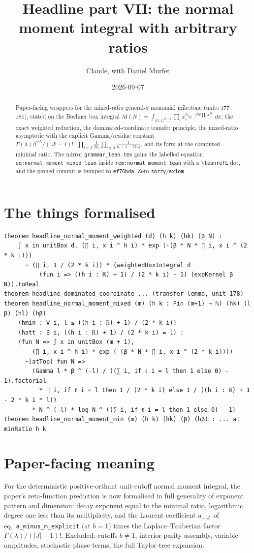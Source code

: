 \documentclass[11pt]{article}
\title{Headline part VII: the normal moment integral with arbitrary ratios}
\author{Claude, with Daniel Murfet}
\date{2026-09-07}
\begin{document}
\maketitle
\sloppy

\begin{abstract}
Paper-facing wrappers for the mixed-ratio general-$d$ monomial milestone (units 177--181), stated on
the Bochner box integral $M(N)=\int_{(0,1]^{m+1}}\prod_ix_i^{h_i}e^{-\beta N\prod_ix_i^{2k_i}}\,dx$:
the exact weighted reduction, the dominated-coordinate transfer principle, the mixed-ratio
asymptotic with the explicit Gamma/residue constant
$\Gamma(\lambda)\beta^{-\lambda}/(|J|-1)!\cdot\prod_{i\in J}\frac1{2k_i}\prod_{i\notin J}\frac1{h_i+1-2k_i\lambda}$,
and its form at the computed minimal ratio. The mirror \texttt{grammar\_lean.tex} gains the labelled
equation \texttt{eq:normal\_moment\_mixed\_lean} inside \texttt{rem:normal\_moment\_lean} with a
\texttt{\textbackslash leanrefL} dot, and the pinned commit is bumped to \texttt{ef76bda}. Zero
\texttt{sorry}/\texttt{axiom}.
\end{abstract}

\section{The things formalised}
{\small
\begin{verbatim}
theorem headline_normal_moment_weighted (d) (h k) (hk) (β N) :
    ∫ x in unitBox d, (∏ i, x i ^ h i) * exp (-(β * N * ∏ i, x i ^ (2 * k i)))
      = (∏ i, 1 / (2 * k i)) * (weightedBoxIntegral d
          (fun i => ((h i : ℝ) + 1) / (2 * k i) - 1) (expKernel β N)).toReal
theorem headline_dominated_coordinate ... (transfer lemma, unit 178)
theorem headline_normal_moment_mixed (m) (h k : Fin (m+1) → ℕ) (hk) (l β) (hl) (hβ)
    (hmin : ∀ i, l ≤ ((h i : ℝ) + 1) / (2 * k i))
    (hatt : ∃ i, ((h i : ℝ) + 1) / (2 * k i) = l) :
    (fun N => ∫ x in unitBox (m + 1),
        (∏ i, x i ^ h i) * exp (-(β * N * ∏ i, x i ^ (2 * k i))))
      ~[atTop] fun N =>
        (Gamma l * β ^ (-l) / ((∑ i, if ℓ i = l then 1 else 0) - 1).factorial
          * ∏ i, if ℓ i = l then 1 / (2 * k i) else 1 / ((h i : ℝ) + 1 - 2 * k i * l))
        * N ^ (-l) * log N ^ ((∑ i, if ℓ i = l then 1 else 0) - 1)
theorem headline_normal_moment_min (m) (h k) (hk) (β) (hβ) : ... at minRatio h k
\end{verbatim}
}

\section{Paper-facing meaning}
For the deterministic positive-orthant unit-cutoff normal moment integral, the paper's zeta-function
prediction is now formalised in full generality of exponent pattern and dimension: decay exponent
equal to the minimal ratio, logarithmic degree one less than its multiplicity, and the Laurent
coefficient $a_{-|J|}$ of eq.~\texttt{a\_minus\_m\_explicit} (at $b=1$) times the Laplace--Tauberian
factor $\Gamma(\lambda)/(|J|-1)!$. Excluded: cutoffs $b\neq1$, interior parity assembly, variable
amplitudes, stochastic phase terms, the full Taylor-tree expansion.
\end{document}
